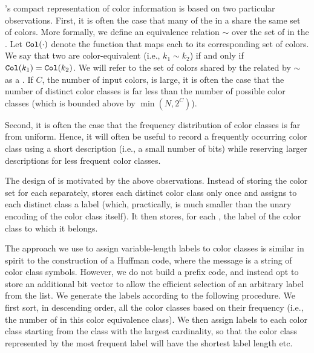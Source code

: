 \system's compact representation of color information is based on two particular
observations. First, it is often the case that many of the \kmers in a \cdbg
share the same set of colors. More formally, we define an equivalence relation
$\sim$ over the set of \kmers in the \dbg. Let $\texttt{Col}(\cdot)$ denote the
function that maps each \kmer to its corresponding set of colors. We say that
two \kmers are color-equivalent (i.e., $k_1 \sim k_2$) if and only if
$\texttt{Col}(k_1) = \texttt{Col}(k_2)$. We will refer to the set of colors shared by the
\kmers related by $\sim$ as a . If $C$, the number of input
colors, is large, it is often the case that the number of distinct color classes
is far less than the number of possible color classes (which is bounded above by
$\min(N,2^C)$).

Second, it is often the case that the frequency distribution of color classes
is far from uniform.  Hence, it will often be useful to record a frequently
occurring color class using a short description (i.e., a small number of bits)
while reserving larger descriptions for less frequent color classes.


The design of \system is motivated by the above observations. Instead of storing
the color set for each \kmer separately, \system stores each distinct color
class only once and assigns to each distinct class a label (which, practically,
is much smaller than the unary encoding of the color class itself).
%
%
%
It then stores, for each \kmer, the label of the color class to which it
belongs. 
%

The approach we use to assign variable-length labels to color classes is similar
in spirit to the construction of a Huffman code, where the message is a string
of color class symbols. However, we do not build a prefix code, and instead opt
to store an additional bit vector to allow the efficient selection of an
arbitrary label from the list. We generate the labels according to the following
procedure. We first sort, in descending order, all the color classes based on
their frequency (i.e., the number of \kmers in this color equivalence class). We
then assign labels to each color class starting from the class with the largest
cardinality, so that the color class represented by the most frequent label will
have the shortest label length etc.

